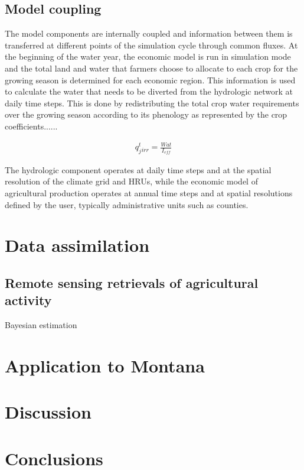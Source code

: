 \documentclass[review]{elsarticle}
\begin{document}
\subsection{Model coupling}

The model components are internally coupled and information between them is transferred at different points of the simulation cycle through common fluxes. At the beginning of the water year, the economic model is run in simulation mode and the total land and water that farmers choose to allocate to each crop for the growing season is determined for each economic region. This information is used to calculate the water that needs to be diverted from the hydrologic network at daily time steps. This is done by redistributing the total crop water requirements over the growing season according to its phenology as represented by the crop coefficients......  

\begin{align}
    q^t_j_{irr} = \frac{Wat}{I_{eff}}
\end{align}


The hydrologic component operates at daily time steps and at the spatial resolution of the climate grid and HRUs, while the economic model of agricultural production operates at annual time steps and at spatial resolutions defined by the user, typically administrative units such as counties.  

\section{Data assimilation}

\subsection{Remote sensing retrievals of agricultural activity}


Bayesian estimation

\section{Application to Montana}




\section{Discussion}

\section{Conclusions}
\end{document}
